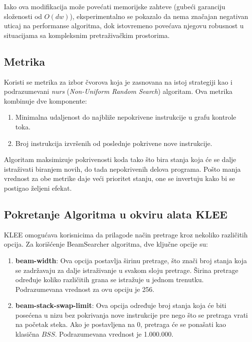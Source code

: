 \documentclass[a4paper]{article}
\begin{document}
Iako ova modifikacija može povećati memorijske zahteve (gubeći garanciju složenosti od \(O(dw)\)), eksperimentalno se pokazalo da nema značajan negativan uticaj na performanse algoritma, dok istovremeno povećava njegovu robusnost u situacijama sa kompleksnim pretraživačkim prostorima.

\subsection{Metrika}

Koristi se metrika za izbor čvorova koja je zasnovana na istoj strategiji kao i podrazumevani \emph{nurs} (\emph{Non-Uniform Random Search}) algoritam. Ova metrika kombinuje dve komponente:

\begin{enumerate}
\item Minimalna udaljenost do najbliže nepokrivene instrukcije u grafu kontrole toka.
\item Broj instrukcija izvršenih od poslednje pokrivene nove instrukcije.
\end{enumerate}

Algoritam maksimizuje pokrivenosti koda tako što bira stanja koja će se dalje istraživati biranjem novih, do tada nepokrivenih delova programa. Pošto manja vrednost za obe metrike daje veći prioritet stanju, one se invertuju kako bi se postigao željeni efekat.

\subsection{Pokretanje Algoritma u okviru alata KLEE}

KLEE omogućava korisnicima da prilagode način pretrage kroz nekoliko različitih opcija. Za korišćenje BeamSearcher algoritma, dve ključne opcije su:
\begin{enumerate}
    \item \textbf{beam-width}: Ova opcija postavlja širinu pretrage, što znači broj stanja koja se zadržavaju za dalje istraživanje u svakom sloju pretrage. Širina pretrage određuje koliko različitih grana se istražuje u jednom trenutku. Podrazumevana vrednost za ovu opciju je 256.
    \item \textbf{beam-stack-swap-limit}:  Ova opcija određuje broj stanja koja će biti posećena u nizu bez pokrivanja nove instrukcije pre nego što se pretraga vrati na početak steka. Ako je postavljena na 0, pretraga će se ponašati kao klasična $BSS$. Podrazumevana vrednost je 1.000.000.
\end{enumerate}
\end{document}
